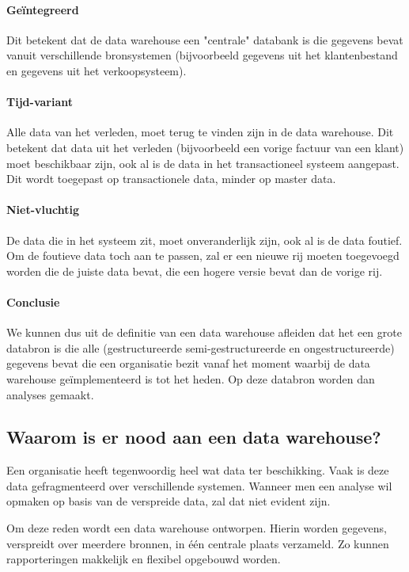 \paragraph{Geïntegreerd}
Dit betekent dat de data warehouse een "centrale" databank is die gegevens bevat vanuit verschillende bronsystemen (bijvoorbeeld gegevens uit het klantenbestand en gegevens uit het verkoopsysteem). 

\paragraph{Tijd-variant}
Alle data van het verleden, moet terug te vinden zijn in de data warehouse. Dit betekent dat data uit het verleden (bijvoorbeeld een vorige factuur van een klant) moet beschikbaar zijn, ook al is de data in het transactioneel systeem aangepast. Dit wordt toegepast op transactionele data, minder op master data.

\paragraph{Niet-vluchtig}
De data die in het systeem zit, moet onveranderlijk zijn, ook al is de data foutief. Om de foutieve data toch aan te passen, zal er een nieuwe rij moeten toegevoegd worden die de juiste data bevat, die een hogere versie bevat dan de vorige rij. 

\paragraph{Conclusie}
We kunnen dus uit de definitie van een data warehouse afleiden dat het een grote databron is die alle (gestructureerde semi-gestructureerde en ongestructureerde) gegevens bevat die een organisatie bezit vanaf het moment waarbij de data warehouse geïmplementeerd is tot het heden. Op deze databron worden dan analyses gemaakt.

\subsection{Waarom is er nood aan een data warehouse?}
Een organisatie heeft tegenwoordig heel wat data ter beschikking. Vaak is deze data gefragmenteerd over verschillende systemen. Wanneer men een analyse wil opmaken op basis van de verspreide data, zal dat niet evident zijn. 

Om deze reden wordt een data warehouse ontworpen. Hierin worden gegevens, verspreidt over meerdere bronnen, in één centrale plaats verzameld. Zo kunnen rapporteringen makkelijk en flexibel opgebouwd worden. 

